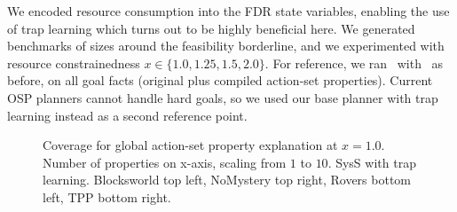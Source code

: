 We encoded resource consumption into the FDR state variables, enabling
the use of trap learning which turns out to be highly beneficial
here. We generated benchmarks of sizes around the feasibility
borderline, and we experimented with resource constrainedness
$x \in \{1.0, 1.25, 1.5, 2.0\}$. For reference, we ran \astar\
with \hlmcut\ as before, on all goal facts (original plus compiled
action-set properties). Current OSP planners cannot handle hard goals,
so we used our base planner with trap learning instead as a second
reference point.

%
\begin{figure}[h!]
\vspace{-0.3cm}
\small
\centering


\vspace{-0.25cm}
\caption{\label{fig:asp-global} Coverage for global action-set 
property explanation at $x=1.0$.  Number of properties on x-axis,
scaling from $1$ to $10$. SysS with trap learning. Blocksworld top
left, NoMystery top right, Rovers bottom left, TPP bottom
right.
}
%
%
%
\vspace{-0.3cm}
\end{figure}

